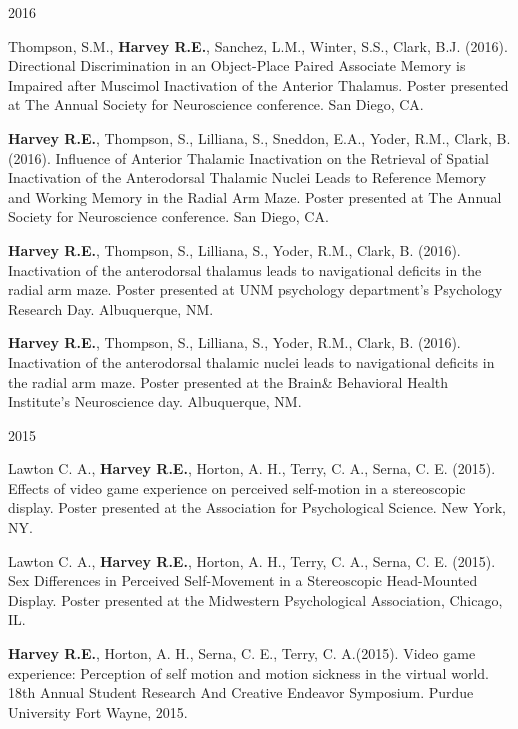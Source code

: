 \begin{cventries}
\cventry
    {} %
    {} %
    {} %
    {2016} %
    {
      \begin{cvitems} %
      \setlength\itemsep{0.4em}
        \item {Thompson, S.M., \textbf{Harvey R.E.}, Sanchez, L.M., Winter, S.S., Clark, B.J. (2016). Directional Discrimination in an Object-Place Paired Associate Memory is Impaired after Muscimol Inactivation of the Anterior Thalamus. Poster presented at The Annual Society for Neuroscience conference. San Diego, CA.}
        \item {\textbf{Harvey R.E.}, Thompson, S., Lilliana, S., Sneddon, E.A., Yoder, R.M., Clark, B. (2016). Influence of Anterior Thalamic Inactivation on the Retrieval of Spatial Inactivation of the Anterodorsal Thalamic Nuclei Leads to Reference Memory and Working Memory in the Radial Arm Maze. Poster presented at The Annual Society for Neuroscience conference. San Diego, CA.}
        \item {\textbf{Harvey R.E.}, Thompson, S., Lilliana, S., Yoder, R.M., Clark, B. (2016). Inactivation of the anterodorsal thalamus leads to navigational deficits in the radial arm maze. Poster presented at UNM psychology department’s Psychology Research Day. Albuquerque, NM.}
        \item {\textbf{Harvey R.E.}, Thompson, S., Lilliana, S., Yoder, R.M., Clark, B. (2016). Inactivation of the anterodorsal thalamic nuclei leads to navigational deficits in the radial arm maze. Poster presented at the Brain\& Behavioral Health Institute’s Neuroscience day. Albuquerque, NM.}
      \end{cvitems}
    }
\end{cventries}


\begin{cventries}
\cventry
    {} %
    {} %
    {} %
    {2015} %
    {
      \begin{cvitems} %
      \setlength\itemsep{0.4em}
        \item {Lawton C. A., \textbf{Harvey R.E.}, Horton, A. H., Terry, C. A., Serna, C. E. (2015). Effects of video game experience on perceived self-motion in a stereoscopic display. Poster presented at the Association for Psychological Science. New York, NY.}
        \item {Lawton C. A., \textbf{Harvey R.E.}, Horton, A. H., Terry, C. A., Serna, C. E. (2015). Sex Differences in Perceived Self-Movement in a Stereoscopic Head-Mounted Display. Poster presented at the Midwestern Psychological Association, Chicago, IL.}
        \item {\textbf{Harvey R.E.}, Horton, A. H., Serna, C. E., Terry, C. A.(2015). Video game experience: Perception of self motion and motion sickness in the virtual world. 18th Annual Student Research And Creative Endeavor Symposium. Purdue University Fort Wayne, 2015.}
      \end{cvitems}
    }
\end{cventries}


